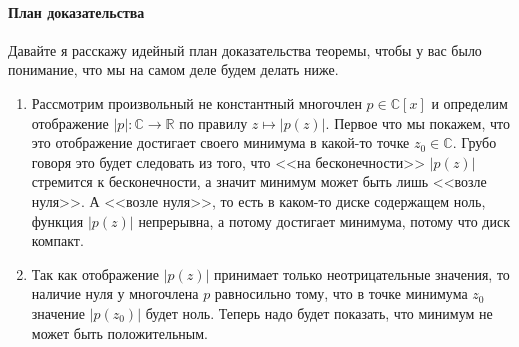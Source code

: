 \paragraph{План доказательства}

Давайте я расскажу идейный план доказательства теоремы, чтобы у вас было понимание, что мы на самом деле будем делать ниже.
\begin{enumerate}
\item Рассмотрим произвольный не константный многочлен $p\in \mathbb C[x]$ и определим отображение $|p| \colon \mathbb C\to \mathbb R$ по правилу $z \mapsto |p(z)|$.
Первое что мы покажем, что это отображение достигает своего минимума в какой-то точке $z_0\in\mathbb C$.
Грубо говоря это будет следовать из того, что <<на бесконечности>> $|p(z)|$ стремится к бесконечности, а значит минимум может быть лишь <<возле нуля>>.
А <<возле нуля>>, то есть в каком-то диске содержащем ноль, функция $|p(z)|$ непрерывна, а потому достигает минимума, потому что диск компакт.

\item Так как отображение $|p(z)|$ принимает только неотрицательные значения, то наличие нуля у многочлена $p$ равносильно тому, что в точке минимума $z_0$ значение $|p(z_0)|$ будет ноль.
Теперь надо будет показать, что минимум не может быть положительным.


\end{enumerate}
